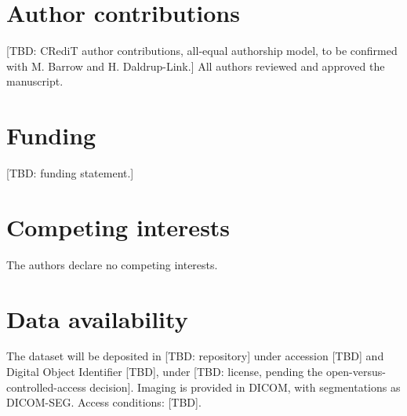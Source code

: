 \documentclass[pdflatex,sn-nature]{sn-jnl}%
\begin{document}


\backmatter


\section*{Author contributions}\label{sec:contrib}
[TBD: CRediT author contributions, all-equal authorship model, to be confirmed with M. Barrow and H. Daldrup-Link.] All authors reviewed and approved the manuscript.

\section*{Funding}\label{sec:funding}
[TBD: funding statement.]

\section*{Competing interests}\label{sec:coi}
The authors declare no competing interests.

\section*{Data availability}\label{sec:dataavail}
The dataset will be deposited in [TBD: repository] under accession [TBD] and Digital Object Identifier [TBD], under [TBD: license, pending the open-versus-controlled-access decision].
Imaging is provided in DICOM, with segmentations as DICOM-SEG.
Access conditions: [TBD].

\end{document}
